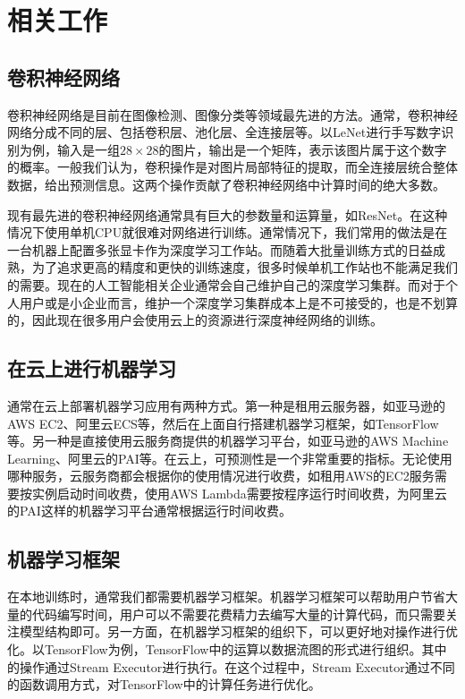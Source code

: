 \chapter{相关工作}
\label{cha:related}

\section{卷积神经网络}
    卷积神经网络是目前在图像检测、图像分类等领域最先进的方法\cite{mcdnn, yolo}。通常，卷积神经网络分成不同的层、包括卷积层、池化层、全连接层等。以LeNet\cite{lenet}进行手写数字识别为例，输入是一组$ 28 \times 28 $的图片，输出是一个矩阵，表示该图片属于这个数字的概率。一般我们认为，卷积操作是对图片局部特征的提取，而全连接层统合整体数据，给出预测信息。这两个操作贡献了卷积神经网络中计算时间的绝大多数。
    
    现有最先进的卷积神经网络通常具有巨大的参数量和运算量，如ResNet\cite{resnet}。在这种情况下使用单机CPU就很难对网络进行训练。通常情况下，我们常用的做法是在一台机器上配置多张显卡作为深度学习工作站。而随着大批量训练方式的日益成熟\cite{bigbatch}，为了追求更高的精度和更快的训练速度，很多时候单机工作站也不能满足我们的需要。现在的人工智能相关企业通常会自己维护自己的深度学习集群。而对于个人用户或是小企业而言，维护一个深度学习集群成本上是不可接受的，也是不划算的，因此现在很多用户会使用云上的资源进行深度神经网络的训练。

\section{在云上进行机器学习}
    通常在云上部署机器学习应用有两种方式。第一种是租用云服务器，如亚马逊的AWS EC2、阿里云ECS等，然后在上面自行搭建机器学习框架，如TensorFlow等。另一种是直接使用云服务商提供的机器学习平台，如亚马逊的AWS Machine Learning、阿里云的PAI等。在云上，可预测性是一个非常重要的指标\cite{cloud, serverless}。无论使用哪种服务，云服务商都会根据你的使用情况进行收费，如租用AWS的EC2服务需要按实例启动时间收费，使用AWS Lambda需要按程序运行时间收费，为阿里云的PAI这样的机器学习平台通常根据运行时间收费。
    
\section{机器学习框架}
    在本地训练时，通常我们都需要机器学习框架。机器学习框架可以帮助用户节省大量的代码编写时间，用户可以不需要花费精力去编写大量的计算代码，而只需要关注模型结构即可。另一方面，在机器学习框架的组织下，可以更好地对操作进行优化。以TensorFlow为例，TensorFlow中的运算以数据流图的形式进行组织。其中的操作通过Stream Executor进行执行。在这个过程中，Stream Executor通过不同的函数调用方式，对TensorFlow中的计算任务进行优化。
    
